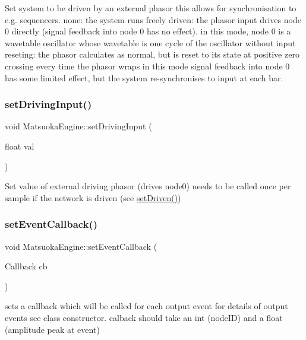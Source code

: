Set system to be driven by an external phasor this allows for synchronisation to e.\+g. sequencers. none\+: the system runs freely driven\+: the phasor input drives node 0 directly (signal feedback into node 0 has no effect). in this mode, node 0 is a wavetable oscillator whose wavetable is one cycle of the oscillator without input reseting\+: the phasor calculates as normal, but is reset to its state at positive zero crossing every time the phasor wraps in this mode signal feedback into node 0 has some limited effect, but the system re-\/synchronises to input at each bar. \mbox{\label{classMatsuokaEngine_a08b0d367297310a788461e3610e80623}} 
\subsubsection{\texorpdfstring{set\+Driving\+Input()}{setDrivingInput()}}
{\footnotesize\ttfamily void Matsuoka\+Engine\+::set\+Driving\+Input (\begin{DoxyParamCaption}\item[{float}]{val }\end{DoxyParamCaption})}

Set value of external driving phasor (drives node0) needs to be called once per sample if the network is driven (see \mbox{\hyperlink{classMatsuokaEngine_a738106afa4c313de36150a9687700193}{set\+Driven()}}) \mbox{\label{classMatsuokaEngine_acaa099b8d5f49430d0fc84c16e0f4e67}} 
\subsubsection{\texorpdfstring{set\+Event\+Callback()}{setEventCallback()}}
{\footnotesize\ttfamily void Matsuoka\+Engine\+::set\+Event\+Callback (\begin{DoxyParamCaption}\item[{Callback}]{cb }\end{DoxyParamCaption})}

sets a callback which will be called for each output event for details of output events see class constructor. calback should take an int (node\+ID) and a float (amplitude peak at event) \mbox{\label{classMatsuokaEngine_a1b932496b53001762dd0224eced6bd09}} 
